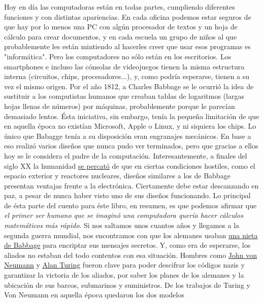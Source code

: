 \documentclass{article}
\begin{document}
Hoy en día las computadoras están en todas partes, cumpliendo diferentes
funciones y con distintas apariencias. En cada oficina podemos estar seguros de
que hay por lo menos una PC con algún procesador de textos y
un hoja de cálculo para crear documentos, y en cada escuela un grupo de niños al que
probablemente les están mintiendo al hacerles creer que usar esos programas es "informática". 
Pero los computadores no sólo están en los escritorios. Los smartphones e incluso 
las cónsolas de videojuegos tienen la misma estructura 
interna (circuitos, chips, procesadores...), y, como podría esperarse, tienen a
su vez el mismo origen.
\newline\newline
Por el año 1812, a Charles Babbage se le ocurrió la idea de sustituir a los
computistas humanos que creaban tablas de logaritmos (largas hojas llenas de números) 
por máquinas, probablemente porque le parecían demasiado lentos. Ésta iniciativa, sin embargo, tenía la pequeña limitación de que 
en aquella época no existían Microsoft, Apple o Linux, y ni siquiera los chips. 
Lo único que Babagge tenía a su disposición eran engranajes mecánicos. En base a eso
realizó varios diseños que nunca pudo ver terminados, pero que gracias a ellos hoy
se le considera el padre de la computación. Interesantemente, a finales del siglo XX 
la humanidad \href{http://www.economist.com/node/324654?story_id=E1_PNQGVQ}{se percató} de que en ciertas condiciones hostiles, como el espacio exterior y reactores nucleares, diseños similares
a los de Babbage presentan ventajas frente a la electrónica. Ciertamente debe estar descanzando en paz, a pesar de nunca haber visto uno de sus diseños funcionando. Lo principal de ésta parte del cuento para éste libro, en resumen, es que podemos afirmar que \emph{el primer ser humano que se imaginó una
computadora quería hacer cálculos matemáticos más rápido}.
\newline\newline
Si nos saltamos unos cuantos años y llegamos a la segunda guerra mundial, nos 
encontramos con que los alemanes usaban 
\href{https://en.wikipedia.org/wiki/Enigma_machine}{una nieta de Babbage} 
para encriptar sus mensajes secretos. Y, como era de esperarse, los aliados no 
estaban del todo contentos con esa situación. Hombres como 
\href{https://es.wikipedia.org/wikiJohn_von_Neumann}{John von Neumann} 
y 
\href{https://es.wikipedia.org/wiki/Alan_Turing}{Alan Turing} 
fueron clave para poder descifrar los códigos nazis y garantizar la victoria de
los aliados, por saber los planes de los alemanes y la ubicación de sus barcos, submarinos y suministros. De los trabajos de Turing y Von Neumann en aquella época quedaron los dos modelos 
\end{document}
